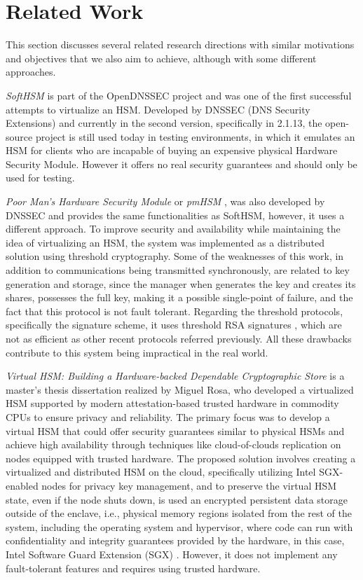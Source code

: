 \documentclass[runningheads]{llncs}
\begin{document}
\section{Related Work} \label{sec:relatedwork}
This section discusses several related research directions with similar motivations and objectives that we also aim to achieve, although with some different approaches.

\textit{SoftHSM} \cite{softhsmgithub} is part of the OpenDNSSEC project \cite{softhsm} and was one of the first successful attempts to virtualize an HSM. Developed by DNSSEC (DNS Security Extensions) and currently in the second version, specifically in 2.1.13, the open-source project is still used today in testing environments, in which it emulates an HSM for clients who are incapable of buying an expensive physical Hardware Security Module. However it offers no real security guarantees and should only be used for testing.

\textit{Poor Man's Hardware Security Module} or \textit{pmHSM} \cite{pmhsm}, was also developed by DNSSEC and provides the same functionalities as SoftHSM, however, it uses a different approach. To improve security and availability while maintaining the idea of virtualizing an HSM, the system was implemented as a distributed solution using threshold cryptography. Some of the weaknesses of this work, in addition to communications being transmitted synchronously, are related to key generation and storage, since the manager when generates the key and creates its shares, possesses the full key, making it a possible single-point of failure, and the fact that this protocol is not fault tolerant. Regarding the threshold protocols, specifically the signature scheme, it uses threshold RSA signatures \cite{practicalthresholdsignatures}, which are not as efficient as other recent protocols referred previously. All these drawbacks contribute to this system being impractical in the real world.

\textit{Virtual HSM: Building a Hardware-backed Dependable Cryptographic Store} \cite{rosahsmthesis} is a master's thesis dissertation realized by Miguel Rosa, who developed a virtualized HSM supported by modern attestation-based trusted hardware in commodity CPUs to ensure privacy and reliability. The primary focus was to develop a virtual HSM that could offer security guarantees similar to physical HSMs and achieve high availability through techniques like cloud-of-clouds replication on nodes equipped with trusted hardware. The proposed solution involves creating a virtualized and distributed HSM on the cloud, specifically utilizing Intel SGX-enabled nodes for privacy key management, and to preserve the virtual HSM state, even if the node shuts down, is used an encrypted persistent data storage outside of the enclave, i.e., physical memory regions isolated from the rest of the system, including the operating system and hypervisor, where code can run with confidentiality and integrity guarantees provided by the hardware, in this case, Intel Software Guard Extension (SGX) \cite{intelsgx}. However, it does not implement any fault-tolerant features and requires using trusted hardware.
\end{document}
